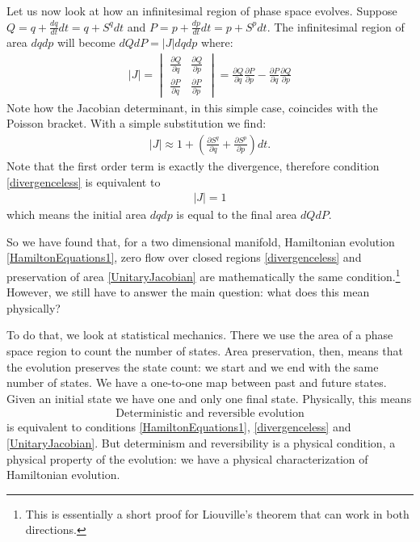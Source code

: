 \documentclass[10pt,twocolumn, nofootinbib]{revtex4-2}
\begin{document}
Let us now look at how an infinitesimal region of phase space evolves. Suppose $Q = q + \frac{dq}{dt} dt = q + S^q dt$ and $P = p + \frac{dp}{dt} dt = p + S^p dt$. The infinitesimal region of area $dq dp$ will become $dQ dP = |J| dq dp$ where:
\begin{align}
	|J| = \begin{vmatrix}
		\frac{\partial Q}{\partial q} & \frac{\partial Q}{\partial p} \\
		\frac{\partial P}{\partial q} & \frac{\partial P}{\partial  p} 
	\end{vmatrix} = \frac{\partial Q}{\partial q} \frac{\partial P}{\partial  p} - \frac{\partial P}{\partial q} \frac{\partial Q}{\partial p}
\end{align}
Note how the Jacobian determinant, in this simple case, coincides with the Poisson bracket. With a simple substitution we find:
\begin{align}
	|J|\approx 1 + \left( \frac{\partial S^q}{\partial q} + \frac{\partial S^p}{\partial p} \right)dt.
\end{align}
Note that the first order term is exactly the divergence, therefore condition \eqref{divergenceless} is equivalent to
\begin{align}\label{UnitaryJacobian}
	|J| = 1
\end{align}
which means the initial area $dqdp$ is equal to the final area $dQdP$.

So we have found that, for a two dimensional manifold, Hamiltonian evolution \eqref{HamiltonEquations1}, zero flow over closed regions \eqref{divergenceless} and preservation of area \eqref{UnitaryJacobian} are mathematically the same condition.\footnote{This is essentially a short proof for Liouville's theorem that can work in both directions.} However, we still have to answer the main question: what does this mean physically?

To do that, we look at statistical mechanics. There we use the area of a phase space region to count the number of states. Area preservation, then, means that the evolution preserves the state count: we start and we end with the same number of states. We have a one-to-one map between past and future states. Given an initial state we have one and only one final state. Physically, this means
\begin{align}\label{DeterminismReversibility}
	\text{Deterministic and reversible evolution}
\end{align}
is equivalent to conditions \eqref{HamiltonEquations1}, \eqref{divergenceless} and \eqref{UnitaryJacobian}. But determinism and reversibility is a physical condition, a physical property of the evolution: we have a physical characterization of Hamiltonian evolution.
\end{document}

